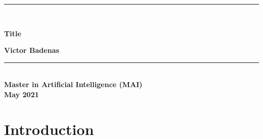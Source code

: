 \documentclass[oneside,12pt]{book}
\begin{document}
\titleformat{\chapter}[display]
{\normalfont\huge\bfseries}{\chaptertitlename\ \thechapter}{20pt}{\Huge}

\begin{center}
\vspace*{2in}
\noindent\hfil\rule{17cm}{0.2mm}\hfil\\
\begin{Huge}
    \textbf{Title\\}
\end{Huge}
\vspace*{0.3in}
\begin{large}
    \textbf{Victor Badenas}
\end{large}
\noindent\hfil\rule{17cm}{0.2mm}\hfil\\
\vspace*{3in}
\textbf{Master in Artificial Intelligence (MAI)\\}
\vspace*{0.2in}
\textbf{May 2021}

\end{center}
\thispagestyle{empty}
\clearpage

\tableofcontents
{}
\clearpage
{}

\chapter{Introduction}


\printbibliography
\end{document}

